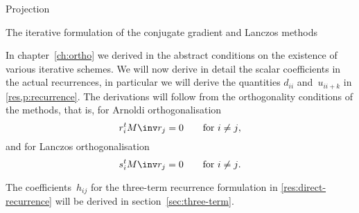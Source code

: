 \documentclass[11pt]{artikel3}
\begin{document}
\begin{Outline}
\begin{comment}
Inspecting the elements of $S^tM\inv AM\inv R$, we find from the $(n,n)$ 
position that
\[s_n^tM\inv AM\inv r_n=s_n^tM\inv r_nh_{nn}=k_{nn}^ts_n^tM\inv r_n \]
\[ \Rightarrow \begin{cases}h_{nn}=(s_n^tM\inv r_n)\inv (s_n^tM\inv AM\inv r_n)\cr
                k_{nn}=(s_n^tM\inv r_n)\invt (s_n^tM\inv AM\inv r_n)^t\end{cases}. \]
Note the similarities between $h_{nn}$ and~$k_{nn}$; in the scalar
case they are obviously equal, but in the block case they are 
neither equal nor each other's transpose.

In a similar manner we derive
\[(n+1,n):\quad k_{nn+1}s_n^tr_n=s_{n+1}^tr_{n+1}h_{n+1n}\]
and
\[(n,n+1):\quad k_{n+1n}s_{n+1}^tr_{n+1}=s_n^tr_nh_{nn+1}.\]
The matrices $H$ and $K$ are related by
\[ H=\Omega^{-1}K^t\Omega \]
where $\Omega$ is the diagonal matrix~$S^tR$.
We see again that $h_{nn}=k_{nn}$ for any scaling of $R$~and~$S$;
if we choose $h_{n+1n}=k_{n+1n}$, then
\[h_{nn+1}=k_{nn+1}={s_{n+1}^tr_{n+1}\over s_n^tr_n}h_{n+1n} \]
so $H=K$. In general, any scaling of the $R$ or 
$S$~sequence that makes $\Omega=I$ causes $H$ and~$K$ to be equal.
\end{comment}

 {Projection}
\label{sec:projection}


 {The iterative formulation of the conjugate gradient and
Lanczos methods}
\label{ch:iterative}

In chapter~\ref{ch:ortho} we derived in the abstract conditions on the
existence of various iterative schemes. 
We will now derive in detail the scalar coefficients in
the actual recurrences, in particular we will derive the quantities
$d_{ii}$ and~$u_{ii+k}$ in \eqref{res,p:recurrence}.
The derivations will follow from the orthogonality conditions of the
methods, that is,
for Arnoldi orthogonalisation
\begin{equation}r_i^tM\inv r_j=0\qquad\hbox{for $i\not=j$},
    \label{eq:r-ortho}\end{equation}
and for Lanczos orthogonalisation
\begin{equation}s_i^tM\inv r_j=0\qquad\hbox{for $i\not=j$}.
    \label{eq:r-biortho}\end{equation}

The coefficients~$h_{ij}$ for the three-term recurrence formulation
in \eqref{res:direct-recurrence}
will be derived in section~\ref{sec:three-term}.


\end{Outline}
\end{document}
